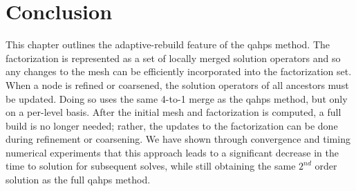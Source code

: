 \section{Conclusion}

This chapter outlines the adaptive-rebuild feature of the \gls{qahps} method. The factorization is represented as a set of locally merged solution operators and so any changes to the mesh can be efficiently incorporated into the factorization set. When a node is refined or coarsened, the solution operators of all ancestors must be updated. Doing so uses the same 4-to-1 merge as the \gls{qahps} method, but only on a per-level basis. After the initial mesh and factorization is computed, a full build is no longer needed; rather, the updates to the factorization can be done during refinement or coarsening. We have shown through convergence and timing numerical experiments that this approach leads to a significant decrease in the time to solution for subsequent solves, while still obtaining the same $2^{nd}$ order solution as the full \gls{qahps} method.